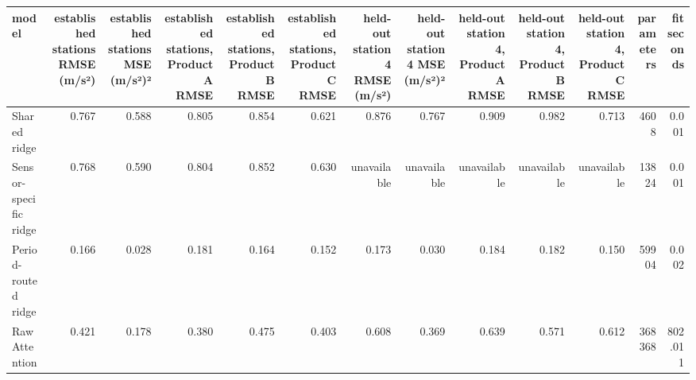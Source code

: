 \begin{tabular}{lrrrrrrrrrrrr}
\toprule
model & established stations RMSE (m/s²) & established stations MSE (m/s²)² & established stations, Product A RMSE & established stations, Product B RMSE & established stations, Product C RMSE & held-out station 4 RMSE (m/s²) & held-out station 4 MSE (m/s²)² & held-out station 4, Product A RMSE & held-out station 4, Product B RMSE & held-out station 4, Product C RMSE & parameters & fit seconds \\
\midrule
Shared ridge & 0.767 & 0.588 & 0.805 & 0.854 & 0.621 & 0.876 & 0.767 & 0.909 & 0.982 & 0.713 & 4608 & 0.001 \\
Sensor-specific ridge & 0.768 & 0.590 & 0.804 & 0.852 & 0.630 & unavailable & unavailable & unavailable & unavailable & unavailable & 13824 & 0.001 \\
Period-routed ridge & 0.166 & 0.028 & 0.181 & 0.164 & 0.152 & 0.173 & 0.030 & 0.184 & 0.182 & 0.150 & 59904 & 0.002 \\
Raw Attention & 0.421 & 0.178 & 0.380 & 0.475 & 0.403 & 0.608 & 0.369 & 0.639 & 0.571 & 0.612 & 368368 & 802.011 \\
\bottomrule
\end{tabular}
